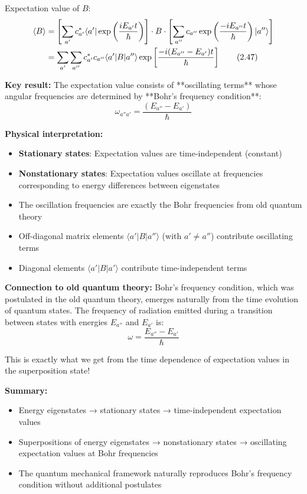 \documentclass[11pt,a4paper]{article}
\begin{document}
Expectation value of $B$:
\begin{align}
\langle B \rangle &= \left[\sum_{a'}c_{a'}^*\langle a'|\exp\left(\frac{iE_{a'}t}{\hbar}\right)\right] \cdot B \cdot \left[\sum_{a''}c_{a''}\exp\left(\frac{-iE_{a''}t}{\hbar}\right)|a''\rangle\right] \notag \\
&= \sum_{a'}\sum_{a''}c_{a'}^*c_{a''}\langle a'|B|a''\rangle\exp\left[\frac{-i(E_{a''} - E_{a'})t}{\hbar}\right]
\tag{2.47}
\end{align}

\textbf{Key result:} The expectation value consists of **oscillating terms** whose angular frequencies are determined by **Bohr's frequency condition**:
\begin{equation}
\boxed{\omega_{a''a'} = \frac{(E_{a''} - E_{a'})}{\hbar}}
\tag{2.48}
\end{equation}

\textbf{Physical interpretation:}
\begin{itemize}
\item \textbf{Stationary states}: Expectation values are time-independent (constant)
\item \textbf{Nonstationary states}: Expectation values oscillate at frequencies corresponding to energy differences between eigenstates
\item The oscillation frequencies are exactly the Bohr frequencies from old quantum theory
\item Off-diagonal matrix elements $\langle a'|B|a''\rangle$ (with $a' \neq a''$) contribute oscillating terms
\item Diagonal elements $\langle a'|B|a'\rangle$ contribute time-independent terms
\end{itemize}

\textbf{Connection to old quantum theory:} Bohr's frequency condition, which was postulated in the old quantum theory, emerges naturally from the time evolution of quantum states. The frequency of radiation emitted during a transition between states with energies $E_{a''}$ and $E_{a'}$ is:
$$\omega = \frac{E_{a''} - E_{a'}}{\hbar}$$

This is exactly what we get from the time dependence of expectation values in the superposition state!

\textbf{Summary:}
\begin{itemize}
\item Energy eigenstates → stationary states → time-independent expectation values
\item Superpositions of energy eigenstates → nonstationary states → oscillating expectation values at Bohr frequencies
\item The quantum mechanical framework naturally reproduces Bohr's frequency condition without additional postulates
\end{itemize}
\end{document}
